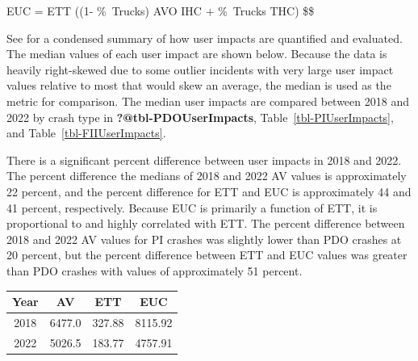 \documentclass[
  letterpaper,
  authoryear]{elsarticle}
\begin{document}
EUC = ETT \times ((1- \%~Trucks) \times AVO \times IHC + \%~Trucks
\times THC) \$\$

See \citet{schultz_analysis_2023} for a condensed summary of how user
impacts are quantified and evaluated. The median values of each user
impact are shown below. Because the data is heavily right-skewed due to
some outlier incidents with very large user impact values relative to
most that would skew an average, the median is used as the metric for
comparison. The median user impacts are compared between 2018 and 2022
by crash type in \textbf{?@tbl-PDOUserImpacts},
Table~\ref{tbl-PIUserImpacts}, and Table~\ref{tbl-FIIUserImpacts}.

There is a significant percent difference between user impacts in 2018
and 2022. The percent difference the medians of 2018 and 2022 AV values
is approximately 22 percent, and the percent difference for ETT and EUC
is approximately 44 and 41 percent, respectively. Because EUC is
primarily a function of ETT, it is proportional to and highly correlated
with ETT. The percent difference between 2018 and 2022 AV values for PI
crashes was slightly lower than PDO crashes at 20 percent, but the
percent difference between ETT and EUC values was greater than PDO
crashes with values of approximately 51 percent.

\begin{table}
\centering
\begin{tabular}[t]{c|c|c|c}
\hline
Year & AV & ETT & EUC\\
\hline
2018 & 6477.0 & 327.88 & 8115.92\\
\hline
2022 & 5026.5 & 183.77 & 4757.91\\
\hline
\end{tabular}
\end{table}
\end{document}
